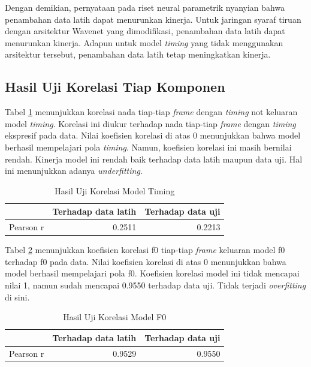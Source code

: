 Dengan demikian, pernyataan pada riset neural parametrik nyanyian bahwa penambahan data latih dapat menurunkan kinerja. Untuk jaringan syaraf tiruan dengan arsitektur Wavenet yang dimodifikasi, penambahan data latih dapat menurunkan kinerja. Adapun untuk model \textit{timing} yang tidak menggunakan arsitektur tersebut, penambahan data latih tetap meningkatkan kinerja.

\subsection{Hasil Uji Korelasi Tiap Komponen}

Tabel \ref{tab-timing-testing-results} menunjukkan korelasi nada tiap-tiap \textit{frame} dengan \textit{timing} not keluaran model \textit{timing}. Korelasi ini diukur terhadap nada tiap-tiap \textit{frame} dengan \textit{timing} ekspresif pada data. Nilai koefisien korelasi di atas 0 menunjukkan bahwa model berhasil mempelajari pola \textit{timing}. Namun, koefisien korelasi ini masih bernilai rendah. Kinerja model ini rendah baik terhadap data latih maupun data uji. Hal ini menunjukkan adanya \textit{underfitting}.

\begin{table}[htbp]
    \centering
    \caption{Hasil Uji Korelasi Model Timing}\label{tab-timing-testing-results}
    \begin{tabular}{ |l|r|r| } 
     \cline{2-3}
     \multicolumn{1}{l|}{}&Terhadap data latih&Terhadap data uji\\\hline
	 Pearson r&0.2511  &0.2213\\\hline
    \end{tabular}
\end{table}

Tabel \ref{tab-f0-testing-results} menunjukkan koefisien korelasi f0 tiap-tiap \textit{frame} keluaran model f0 terhadap f0 pada data. Nilai koefisien korelasi di atas 0 menunjukkan bahwa model berhasil mempelajari pola f0. Koefisien korelasi model ini tidak mencapai nilai 1, namun sudah mencapai 0.9550 terhadap data uji. Tidak terjadi \textit{overfitting} di sini.
\begin{table}[htbp]
    \centering
    \caption{Hasil Uji Korelasi Model F0}\label{tab-f0-testing-results}
    \begin{tabular}{ |l|r|r| } 
     \cline{2-3}
     \multicolumn{1}{l|}{}&Terhadap data latih&Terhadap data uji\\\hline
	 Pearson r&0.9529  &0.9550\\\hline
    \end{tabular}
\end{table}

